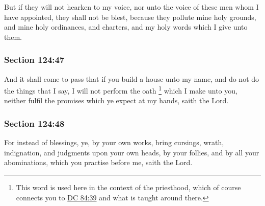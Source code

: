 		But if they will not hearken to my voice, nor unto the voice of these men whom I have appointed, they shall not be blest, because they pollute mine holy grounds, and mine holy ordinances, and charters, and my holy words which I give unto them.


	\subsubsection{Section 124:47} %
		\label{DC124-47}

		And it shall come to pass that if you build a house unto my name, and do not do the things that I say, I will not perform the oath%
			\footnote{%
				This word is used here in the context of the priesthood, which of course connects you to \hyperref[DC84-39]{DC 84:39} and what is taught around there.
				}
		which I make unto you, neither fulfil the promises which ye expect at my hands, saith the Lord.


	\subsubsection{Section 124:48} %
		\label{DC124-48}

		For instead of blessings, ye, by your own works, bring cursings, wrath, indignation, and judgments upon your own heads, by your follies, and by all your abominations, which you practise before me, saith the Lord.


